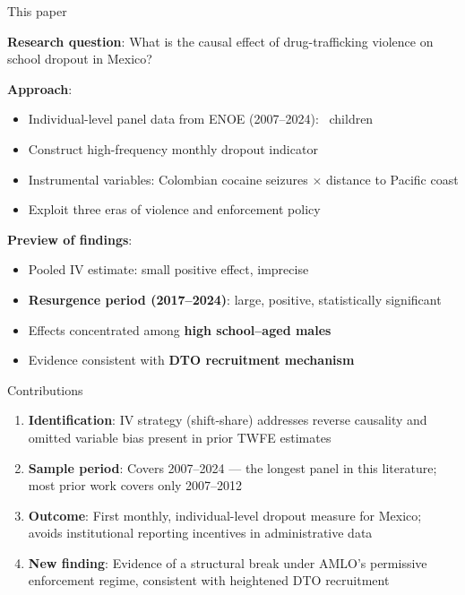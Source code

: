 \documentclass[aspectratio=169]{beamer}
\begin{document}
\begin{frame}{This paper}

\textbf{Research question}: What is the causal effect of drug-trafficking violence on school dropout in Mexico?

\pause
\vspace{0.5cm}

\textbf{Approach}:
\begin{itemize}
    \item Individual-level panel data from ENOE (2007--2024): \totalKids\ children
    \item Construct high-frequency monthly dropout indicator
    \item Instrumental variables: Colombian cocaine seizures $\times$ distance to Pacific coast
    \item Exploit three eras of violence and enforcement policy
\end{itemize}

\pause
\vspace{0.5cm}

\textbf{Preview of findings}:
\begin{itemize}
    \item Pooled IV estimate: small positive effect, imprecise
    \item \textbf{Resurgence period (2017--2024)}: large, positive, statistically significant
    \item Effects concentrated among \textbf{high school--aged males}
    \item Evidence consistent with \textbf{DTO recruitment mechanism}
\end{itemize}

\end{frame}


\begin{frame}{Contributions}
\begin{enumerate}
    \item \textbf{Identification}: IV strategy (shift-share) addresses reverse causality and omitted variable bias present in prior TWFE estimates

    \vspace{0.4cm}

    \item \textbf{Sample period}: Covers 2007--2024 --- the longest panel in this literature; most prior work covers only 2007--2012

    \vspace{0.4cm}

    \item \textbf{Outcome}: First monthly, individual-level dropout measure for Mexico; avoids institutional reporting incentives in administrative data

    \vspace{0.4cm}

    \item \textbf{New finding}: Evidence of a structural break under AMLO's permissive enforcement regime, consistent with heightened DTO recruitment
\end{enumerate}
\end{frame}
\end{document}

